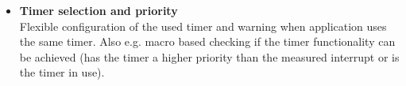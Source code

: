 \begin{itemize}
	
	\item \textbf{Timer selection and priority}\\
	Flexible configuration of the used timer and warning when application uses the same timer. Also e.g. macro based checking if the timer functionality can be achieved (has the timer a higher priority than the measured interrupt or is the timer in use).
	
\end{itemize}

